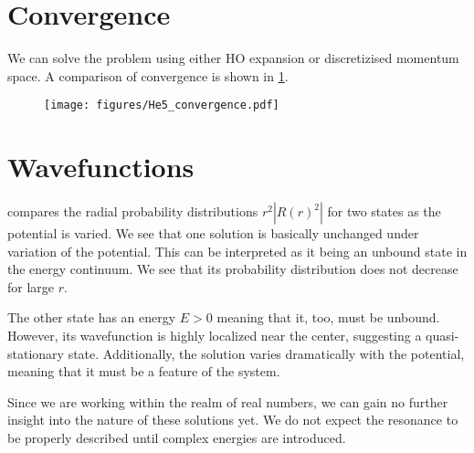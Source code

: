 \section{Convergence}
We can solve the problem using either HO expansion or discretizised momentum space. A comparison of convergence is shown in \cref{fig:HO vs mom}.
\begin{figure}
  \centering
    \texttt{[image: figures/He5\_convergence.pdf]}
  \caption{}
  \label{fig:HO vs mom}
\end{figure}

\section{Wavefunctions}

 compares the radial probability distributions $r^2|R(r)^2|$ for two states as the potential is varied. We see that one solution is basically unchanged under variation of the potential. This can be interpreted as it being an unbound state in the energy continuum. We see that its probability distribution does not decrease for large $r$.

The other state has an energy $E>0$ meaning that it, too, must be unbound. However, its wavefunction is highly localized near the center, suggesting a quasi-stationary state. Additionally, the solution varies dramatically with the potential, meaning that it must be a feature of the system. 

Since we are working within the realm of real numbers, we can gain no further insight into the nature of these solutions yet. We do not expect the resonance to be properly described until complex energies are introduced.


